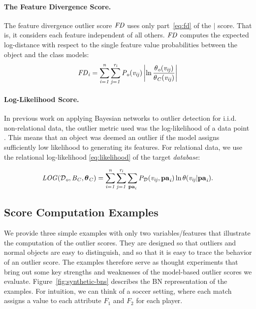 {\paragraph{The Feature Divergence Score.}
The feature divergence outlier score $\it{FD}$ uses only part~\eqref{eq:fd} of the $\mid$ score. That is, it considers each feature independent of all others.  $\it{FD}$ computes the expected log-distance with respect to  the single feature value probabilities between the object and the class models:
\begin{equation}
\it{FD}_{i}	=\sum_{i=1}^{n}\sum_{j=1}^{r_{i}} P_{o}( v_{ij}) \left|\ln \frac{\theta_{o}( v_{ij})}{\theta_{C}( v_{ij})}\right|
\end{equation}


\paragraph{Log-Likelihood Score.} 

In previous work on applying Bayesian networks to outlier detection for i.i.d. non-relational data, the outlier metric used was the log-likelihood of a data point \citep{Cansado2008}. This means that an object was deemed an outlier if the model assigns sufficiently low likelihood to generating its features. For relational data, we use the relational log-likelihood \eqref{eq:likelihood} of the target {\em database}:

\begin{equation} \label{eq:loglikelihood-score}
\it{LOG}(\mathcal{D}_{o},B_{C},\boldsymbol{\theta}_{C}) =   \sum_{i=1}^{n}\sum_{j=1}^{r_{i}} \sum_{\mathbf{pa}_{i}}P_{\mathcal{D}}(v_{ij},\mathbf{pa}_{i})\ln \theta(v_{ij}|\mathbf{pa}_{i}).
\end{equation}




\subsection{Score Computation Examples} \label{sec:divergence-examples} 
			
			
			We provide three simple examples with only two variables/features that illustrate the computation of the outlier scores. They are designed so that outliers and normal objects are easy to distinguish, and so that it is easy to trace the behavior of an outlier score.
			The examples therefore serve as thought experiments that bring out some key strengths and weaknesses of the model-based outlier scores we evaluate. 
			Figure~\ref{fig:synthetic-bns} describes the BN representation of the examples. For intuition, we can think of a soccer setting, where each match assigns a value to each attribute $F_{1}$ and $F_{2}$ for each player. 
			
}
